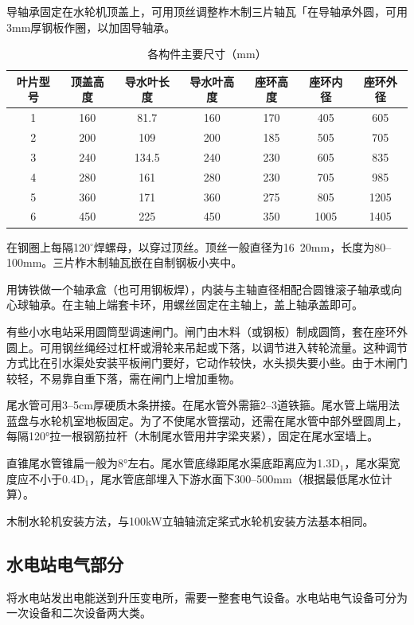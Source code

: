 \documentclass{ctexbook}
\begin{document}
导轴承固定在水轮机顶盖上，可用顶丝调整柞木制三片轴瓦「在导轴承外圆，可用3mm厚钢板作圈，以加固导轴承。
\begin{table}[htbp]
	\centering
	\caption{各构件主要尺寸（mm）}
	\begin{tabular}{c|c|c|c|c|c|c}
		\hline
		叶片型号 & 顶盖高度 & 导水叶长度 & 导水叶高度 & 座环高度  & 座环内径  & 座环外径 \\ \hline
		1     & 160   & 81.7  & 160   & 170   & 405   & 605 \\ \hline
		2     & 200   & 109   & 200   & 185   & 505   & 705 \\ \hline
		3     & 240   & 134.5 & 240   & 230   & 605   & 835 \\ \hline
		4     & 280   & 161   & 280   & 230   & 705   & 985 \\ \hline
		5     & 360   & 171   & 360   & 275   & 805   & 1205 \\ \hline
		6     & 450   & 225   & 450   & 350   & 1005  & 1405 \\ \hline
	\end{tabular}%
	\label{tab:addlabel}%
\end{table}%

在钢圈上每隔120$^\circ$焊螺母，以穿过顶丝。顶丝一般直径为16~20mm，长度为80--100mm。三片柞木制轴瓦嵌在自制钢板小夹中。

用铸铁做一个轴承盒（也可用钢板焊），内装与主轴直径相配合圆锥滚子轴承或向心球轴承。在主轴上端套卡环，用螺丝固定在主轴上，盖上轴承盖即可。

有些小水电站采用圆筒型调速闸门。闸门由木料（或钢板）制成圆筒，套在座环外圆上。可用钢丝绳经过杠杆或滑轮来吊起或下落，以调节进入转轮流量。这种调节方式比在引水渠处安装平板闸门要好，它动作较快，水头损失要小些。由于木闸门较轻，不易靠自重下落，需在闸门上增加重物。

尾水管可用3--5cm厚硬质木条拼接。在尾水管外需箍2--3道铁箍。尾水管上端用法蓝盘与水轮机室地板固定。为了不使尾水管摆动，还需在尾水管中部外壁圆周上，每隔120°拉一根钢筋拉杆（木制尾水管用井字梁夹紧），固定在尾水室墙上。

直锥尾水管锥扁一般为8°左右。尾水管底缘距尾水渠底距离应为1.3D$_1$，尾水渠宽度应不小于0.4D$_1$，尾水管底部埋入下游水面下300--500mm（根据最低尾水位计算）。

木制水轮机安装方法，与100kW立轴轴流定桨式水轮机安装方法基本相同。
\subsection{水电站电气部分}
将水电站发出电能送到升压变电所，需要一整套电气设备。水电站电气设备可分为一次设备和二次设备两大类。
\end{document}
